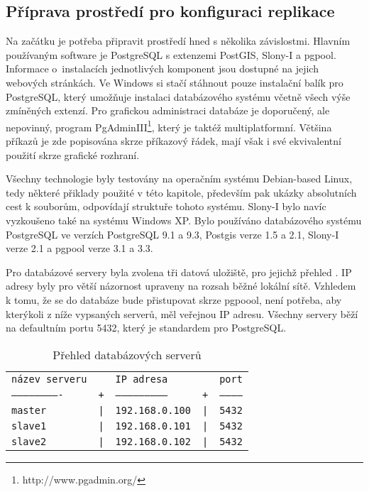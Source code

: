       \subsection{Příprava prostředí pro konfiguraci replikace}
      \label{kPriprava}
Na začátku je potřeba připravit prostředí hned s několika závislostmi. Hlavním používaným software je PostgreSQL s extenzemi PostGIS, Slony-I a pgpool. Informace o~instalacích jednotlivých komponent jsou dostupné na jejich webových stránkách. Ve Windows si stačí stáhnout pouze instalační balík pro PostgreSQL, který umožňuje instalaci databázového systému včetně všech výše zmíněných extenzí. Pro grafickou administraci databáze je doporučený, ale nepovinný, program \mbox{PgAdminIII}\footnote{http://www.pgadmin.org/}, který je taktéž multiplatformní. Většina příkazů je zde popisována skrze příkazový řádek, mají však i své ekvivalentní použití skrze grafické rozhraní.

Všechny technologie byly testovány na operačním systému Debian-based Linux, tedy některé přiklady použité v této kapitole, především pak ukázky absolutních cest k souborům, odpovídají struktuře tohoto systému. Slony-I bylo navíc vyzkoušeno také na systému Windows XP. Bylo používáno databázového systému PostgreSQL ve verzích PostgreSQL 9.1 a 9.3, Postgis verze 1.5 a 2.1, Slony-I verze 2.1 a pgpool verze 3.1 a 3.3.

Pro databázové servery byla zvolena tři datová uložiště, pro jejichž přehled . IP adresy byly pro větší názornost upraveny na rozsah běžné lokální sítě. Vzhledem k tomu, že se do databáze bude přistupovat skrze pgpoool, není potřeba, aby kterýkoli z níže vypsaných serverů, měl veřejnou IP adresu. Všechny servery běží na defaultním portu 5432, který je standardem pro PostgreSQL.

        \begin{table}[H]
          \caption[Přehled databázových serverů]{Přehled databázových serverů}
            \label{tServery}
          \begin{footnotesize}
            \begin{center}
            \begin{tabular}{lllll}
              \texttt{název serveru} & & \texttt{IP adresa} & & \texttt{port}\\
              \texttt{-------------------------} & \texttt{+} & \texttt{--------------------------} & \texttt{+} & \texttt{------------}\\
                                 \texttt{master} & \texttt{|} & \texttt{192.168.0.100} & \texttt{|} & \texttt{5432}\\
                                 \texttt{slave1} & \texttt{|} & \texttt{192.168.0.101} & \texttt{|} & \texttt{5432}\\
                                 \texttt{slave2} & \texttt{|} & \texttt{192.168.0.102} & \texttt{|} & \texttt{5432}\\
              \end{tabular}
            \end{center}
          \end{footnotesize}
        \end{table}

